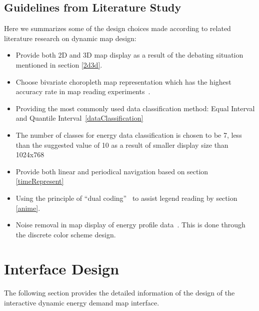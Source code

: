 \subsection{Guidelines from Literature Study}
Here we summarizes some of the design choices made according to
related literature research on dynamic map design:
\begin{itemize}
\item Provide both 2D and 3D map display as a result of the debating
  situation mentioned in section \ref{2d3d}.
\item Choose bivariate choropleth map representation which has the
  highest accuracy rate in map reading experiments~\cite{Elmer2012}.
\item Providing the most commonly used data classification method:
  Equal Interval and Quantile Interval~\ref{dataClassification}
\item The number of classes for energy data classification is chosen
  to be 7, less than the suggested value of 10 as a result of smaller
  display size than 1024x768~\cite{doi:10.1559/1523040639298}
\item Provide both linear and periodical navigation based on section
  \ref{timeRepresent}
\item Using the principle of ``dual coding''~\cite{Resch2014} to
  assist legend reading by section \ref{anime}.
\item Noise removal in map display of energy profile
  data~\cite{Dorling1992}. This is done through the discrete color
  scheme design.
\end{itemize}

\section{Interface Design}\label{interfaceDesign}
The following section provides the detailed information of the design
of the interactive dynamic energy demand map interface.

